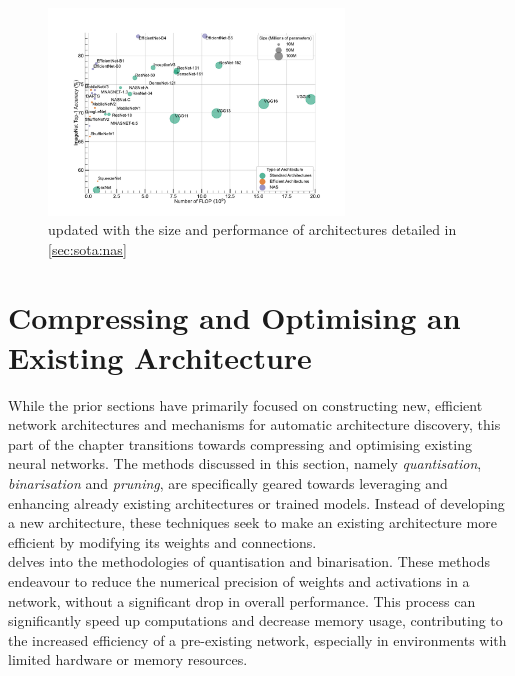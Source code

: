 \begin{figure}[htbp]
  \centering
  \includegraphics[width=0.70\textwidth]{chapter_sota/assets/network_sizes_normal_eff_nas.pdf}
  \caption{ updated with the size and
    performance of architectures detailed in \cref{sec:sota:nas}}
  \label{fig:sota:net_sizes_std_eff_nas}
\end{figure}

\section{Compressing and Optimising an Existing Architecture}\label{sec:sota:refining_existing}

While the prior sections have primarily focused on constructing new, efficient
network architectures and mechanisms for automatic architecture discovery, this
part of the chapter transitions towards compressing and optimising existing neural
networks. The methods discussed in this section, namely \emph{quantisation},
\emph{binarisation} and \emph{pruning}, are specifically geared towards
leveraging and enhancing already existing architectures or trained models.
Instead of developing a new architecture, these techniques seek to make an
existing architecture more efficient by modifying its weights and connections.\\

 delves into the methodologies of quantisation and
binarisation. These methods endeavour to reduce the numerical precision of
weights and activations in a network, without a significant drop in overall
performance. This process can significantly speed up computations and decrease
memory usage, contributing to the increased efficiency of a pre-existing
network, especially in environments with limited hardware or memory resources.\\


